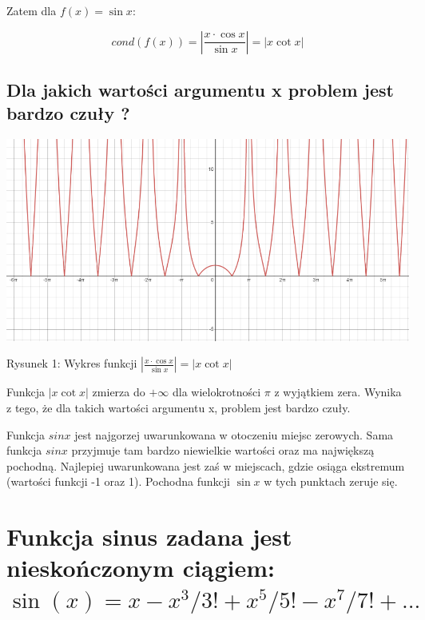 \documentclass[5]{article}
\begin{document}
Zatem dla $f\left ( x \right )=\sin x$:

\[cond\left ( f\left ( x \right ) \right ) = \left | \frac{x\cdot \cos x}{\sin x} \right | = \left | x \cot x \right |\]


\subsection{Dla jakich wartości argumentu x problem jest bardzo czuły ?}
\vspace{5mm}

\hfil
\includegraphics[scale=0.5]{wykres_lab1.PNG} \par
\vspace{3mm}
\hfil{Rysunek 1: Wykres funkcji $\left | \frac{x\cdot \cos x}{\sin x} \right | = \left | x \cot x \right | $} \par

\vspace{5mm}

Funkcja $\left | x \cot x \right |$ zmierza do $+\infty $ dla wielokrotności $\pi$ z wyjątkiem zera. Wynika z tego, że dla takich wartości argumentu x, problem jest bardzo czuły.
\vspace{3mm}

Funkcja $sin x$ jest najgorzej uwarunkowana w otoczeniu miejsc zerowych. Sama funkcja $sin x$ przyjmuje tam bardzo niewielkie wartości oraz ma największą pochodną. Najlepiej uwarunkowana jest zaś w miejscach, gdzie osiąga ekstremum (wartości funkcji -1 oraz 1). Pochodna funkcji $\sin x$ w tych punktach zeruje się.


\section{ Funkcja sinus zadana jest nieskończonym ciągiem: \\ $\sin \left ( x \right ) = x-x^{3}/3! + x^{5}/5! - x^{7}/7!+...$}
\end{document}
